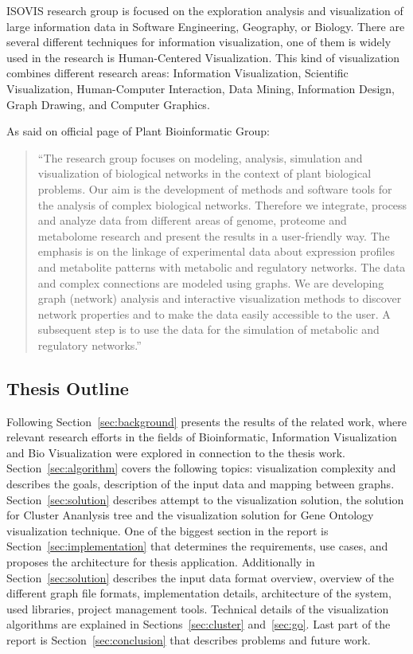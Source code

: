 ISOVIS research group is focused on the exploration analysis and visualization of large information data in Software Engineering, Geography, or Biology. There are several different techniques for information visualization, one of them is widely used in the research is Human-Centered Visualization. This kind of visualization combines different research areas: Information Visualization, Scientific Visualization, Human-Computer Interaction, Data Mining, Information Design, Graph Drawing, and Computer Graphics.


As said on official page of Plant Bioinformatic Group:
\begin{quotation}
``The research group focuses on modeling, analysis, simulation and visualization of biological networks in the context of plant biological problems.
Our aim is the development of methods and software tools for the analysis of complex biological networks.
Therefore we integrate, process and analyze data from different areas of genome, proteome and metabolome research and present the results in a user-friendly way.
The emphasis is on the linkage of experimental data about expression profiles and metabolite patterns with metabolic and regulatory networks.
The data and complex connections are modeled using graphs. We are developing graph (network) analysis and interactive visualization methods to discover network properties and to make the data easily accessible to the user.
A subsequent step is to use the data for the simulation of metabolic and regulatory networks.''~\cite{PBG}
\end{quotation}


\subsection{Thesis Outline}
\label{sec:structure}

Following Section~\ref{sec:background} presents the results of the related work, where relevant research efforts in the fields of Bioinformatic, Information Visualization and Bio Visualization were explored in connection to the thesis work. Section~\ref{sec:algorithm} covers the following topics: visualization complexity and describes the goals, description of the input data and mapping between graphs. Section~\ref{sec:solution} describes attempt to the visualization solution, the solution for Cluster Ananlysis tree and the visualization solution for Gene Ontology visualization technique. One of the biggest section in the report is Section~\ref{sec:implementation} that determines the requirements, use cases, and proposes the architecture for thesis application.
Additionally in Section~\ref{sec:solution} describes the input data format overview, overview of the different graph file formats, implementation details, architecture of the system, used libraries, project management tools. Technical details of the visualization algorithms are explained in Sections~\ref{sec:cluster} and~\ref{sec:go}. Last part of the report is Section~\ref{sec:conclusion} that describes problems and future work.

